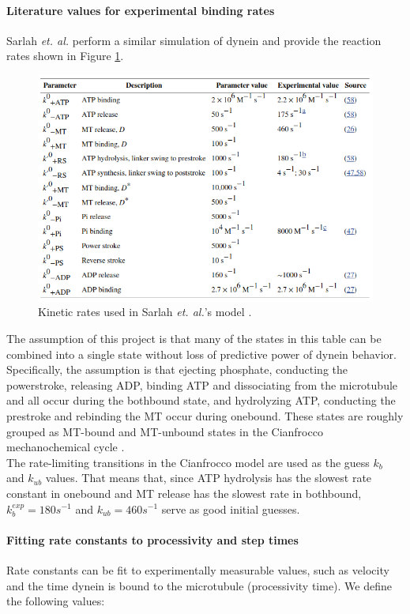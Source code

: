 \documentclass[10pt]{article} %
\begin{document}
\paragraph{Literature values for experimental binding rates}
Sarlah \textit{et. al.} \cite{sarlahmodel} perform a similar simulation of dynein and provide the reaction rates shown in Figure \ref{fig:sarlah-rate-table}.

\begin{figure}[h]
  \centering
  \includegraphics[width=.45\textwidth]{../../figures/SarlahParameterTable.png}
  \caption{Kinetic rates used in Sarlah \textit{et. al.}'s model \cite{sarlahmodel}.}
  \label{fig:sarlah-rate-table}
\end{figure}

The assumption of this project is that many of the states in this table can be combined into a single state without loss of predictive power of dynein behavior. Specifically, the assumption is that ejecting phosphate, conducting the powerstroke, releasing ADP, binding ATP and dissociating from the microtubule and all occur during the bothbound state, and hydrolyzing ATP, conducting the prestroke and rebinding the MT occur during onebound. These states are roughly grouped as MT-bound and MT-unbound states in the Cianfrocco mechanochemical cycle \cite{cianfroccoreview}.\\

The rate-limiting transitions in the Cianfrocco model are used as the guess $k_b$ and $k_{ub}$ values. That means that, since ATP hydrolysis has the slowest rate constant in onebound and MT release has the slowest rate in bothbound, $k_b^{exp} = 180 s^{-1}$ and $k_{ub} = 460 s^{-1}$ serve as good initial guesses.\\

\paragraph{Fitting rate constants to processivity and step times}
Rate constants can be fit to experimentally measurable values, such as velocity and the time dynein is bound to the microtubule (processivity time). We define the following values:
\end{document}
